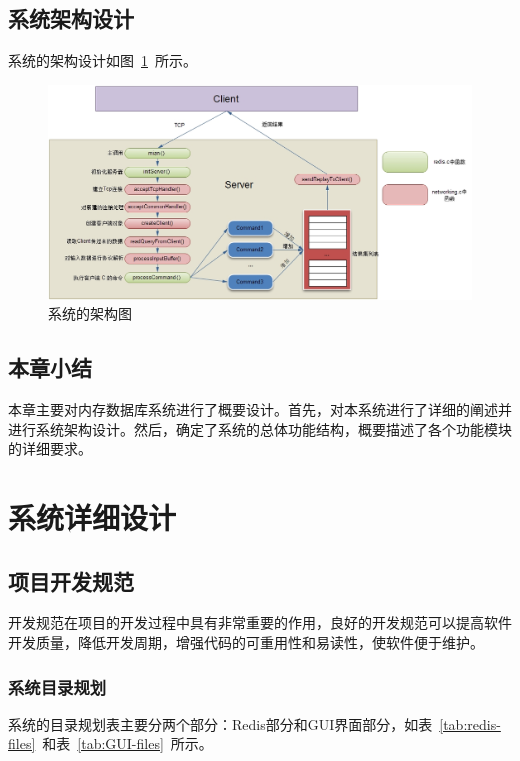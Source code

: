 \documentclass{zjutthesis}
\begin{document}
\section{系统架构设计}

系统的架构设计如图~\ref{fig:System}~所示。
\begin{figure}[H]
\centering
\includegraphics[width=\textwidth]{System}
\caption{系统的架构图}\label{fig:System}
\vspace{\baselineskip} %
\end{figure}

\section{本章小结}
本章主要对内存数据库系统进行了概要设计。首先，对本系统进行了详细的阐述并进行系统架构设计。然后，确定了系统的总体功能结构，概要描述了各个功能模块的详细要求。


\chapter{系统详细设计}
\section{项目开发规范}
开发规范在项目的开发过程中具有非常重要的作用，良好的开发规范可以提高软件开发质量，降低开发周期，增强代码的可重用性和易读性，使软件便于维护。

\subsection{系统目录规划}
系统的目录规划表主要分两个部分：Redis部分和GUI界面部分，如表~\ref{tab:redis-files}~和表~\ref{tab:GUI-files}~所示。
\end{document}

